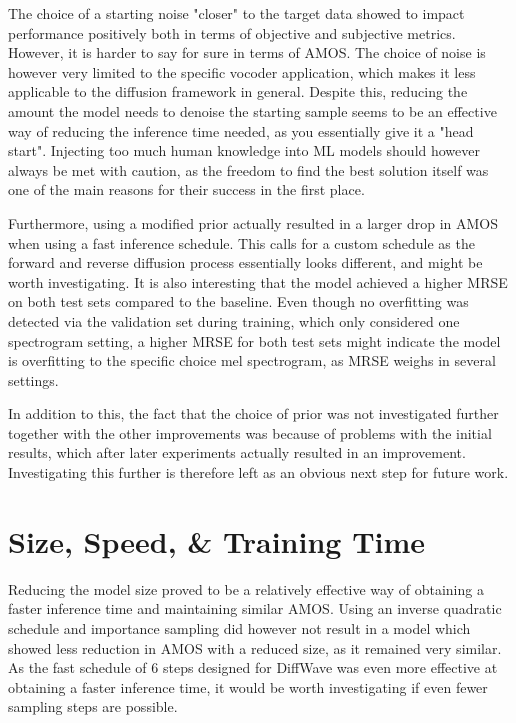 \documentclass{report}
\begin{document}
The choice of a starting noise "closer" to the target data showed to impact performance positively both in terms of objective and subjective metrics. However, it is harder to say for sure in terms of AMOS. The choice of noise is however very limited to the specific vocoder application, which makes it less applicable to the diffusion framework in general. Despite this, reducing the amount the model needs to denoise the starting sample seems to be an effective way of reducing the inference time needed, as you essentially give it a "head start". Injecting too much human knowledge into ML models should however always be met with caution, as the freedom to find the best solution itself was one of the main reasons for their success in the first place.

Furthermore, using a modified prior actually resulted in a larger drop in AMOS when using a fast inference schedule. This calls for a custom schedule as the forward and reverse diffusion process essentially looks different, and might be worth investigating. It is also interesting that the model achieved a higher MRSE on both test sets compared to the baseline. Even though no overfitting was detected via the validation set during training, which only considered one spectrogram setting, a higher MRSE for both test sets might indicate the model is overfitting to the specific choice mel spectrogram, as MRSE weighs in several settings.

In addition to this, the fact that the choice of prior was not investigated further together with the other improvements was because of problems with the initial results, which after later experiments actually resulted in an improvement. Investigating this further is therefore left as an obvious next step for future work.

\section{Size, Speed, \& Training Time}

Reducing the model size proved to be a relatively effective way of obtaining a faster inference time and maintaining similar AMOS. Using an inverse quadratic schedule and importance sampling did however not result in a model which showed less reduction in AMOS with a reduced size, as it remained very similar. As the fast schedule of 6 steps designed for DiffWave was even more effective at obtaining a faster inference time, it would be worth investigating if even fewer sampling steps are possible.
\end{document}

